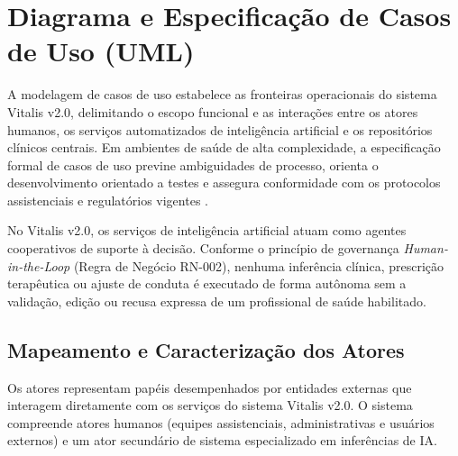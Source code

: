 \section{Diagrama e Especificação de Casos de Uso (UML)}
\label{sec:casos_uso}

A modelagem de casos de uso estabelece as fronteiras operacionais do sistema Vitalis v2.0, delimitando o escopo funcional e as interações entre os atores humanos, os serviços automatizados de inteligência artificial e os repositórios clínicos centrais. Em ambientes de saúde de alta complexidade, a especificação formal de casos de uso previne ambiguidades de processo, orienta o desenvolvimento orientado a testes e assegura conformidade com os protocolos assistenciais e regulatórios vigentes \cite{pressman:2016, sommerville:2019}.

No Vitalis v2.0, os serviços de inteligência artificial atuam como agentes cooperativos de suporte à decisão. Conforme o princípio de governança \textit{Human-in-the-Loop} (Regra de Negócio RN-002), nenhuma inferência clínica, prescrição terapêutica ou ajuste de conduta é executado de forma autônoma sem a validação, edição ou recusa expressa de um profissional de saúde habilitado.

\subsection{Mapeamento e Caracterização dos Atores}
\label{sec:atores}

Os atores representam papéis desempenhados por entidades externas que interagem diretamente com os serviços do sistema Vitalis v2.0. O sistema compreende atores humanos (equipes assistenciais, administrativas e usuários externos) e um ator secundário de sistema especializado em inferências de IA.

